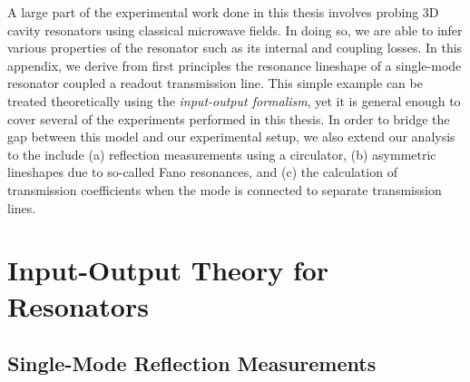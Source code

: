 A large part of the experimental work done in this thesis involves probing 3D cavity resonators using classical microwave fields. In doing so, we are able to infer various properties of the resonator such as its internal and coupling losses. In this appendix, we derive from first principles the resonance lineshape of a single-mode resonator coupled a readout transmission line. This simple example can be treated theoretically using the \textit{input-output formalism}, yet it is general enough to cover several of the experiments performed in this thesis. In order to bridge the gap between this model and our experimental setup, we also extend our analysis to the include (a) reflection measurements using a circulator, (b) asymmetric lineshapes due to so-called Fano resonances, and (c) the calculation of transmission coefficients when the mode is connected to separate transmission lines. 

\section{Input-Output Theory for Resonators}
\subsection{Single-Mode Reflection Measurements}

